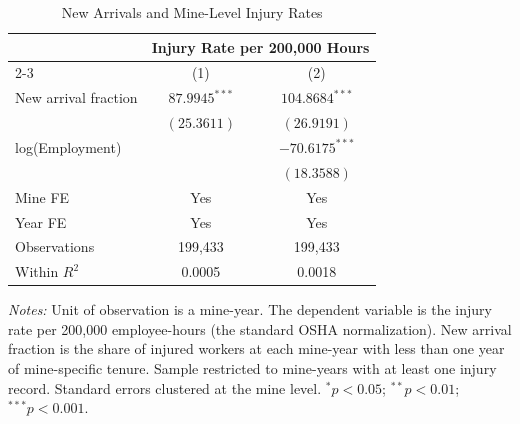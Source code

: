 \begin{table}[t]
\centering
\caption{New Arrivals and Mine-Level Injury Rates}
\label{tab:panel}
\begin{tabular}{lcc}
\toprule
 & \multicolumn{2}{c}{Injury Rate per 200,000 Hours} \\
\cmidrule(lr){2-3}
 & (1) & (2) \\
\midrule
New arrival fraction & $87.9945^{***}$ & $104.8684^{***}$ \\
 & $(25.3611)$ & $(26.9191)$ \\
\addlinespace
log(Employment) & & $-70.6175^{***}$ \\
 & & $(18.3588)$ \\
\midrule
Mine FE & Yes & Yes \\
Year FE & Yes & Yes \\
Observations & 199,433 & 199,433 \\
Within $R^2$ & 0.0005 & 0.0018 \\
\bottomrule
\end{tabular}
\begin{tablenotes}[flushleft]
\item \textit{Notes:} Unit of observation is a mine-year. The dependent variable is the injury rate per 200,000 employee-hours (the standard OSHA normalization). New arrival fraction is the share of injured workers at each mine-year with less than one year of mine-specific tenure. Sample restricted to mine-years with at least one injury record. Standard errors clustered at the mine level. $^{*}p<0.05$; $^{**}p<0.01$; $^{***}p<0.001$.
\end{tablenotes}
\end{table}

